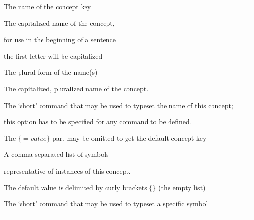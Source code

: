 \documentclass[10pt]{article}
\begin{document}
\begin{description}
	\item[name]            
    \item The name of the concept key
	\item[Name]            
	\item The capitalized name of the concept, 
	\item for use in the beginning of a sentence 
	\item the first letter will be capitalized
	\item[plural]            
	\item The plural form of the name(s)
	\item[Plural]            
	\item The capitalized, pluralized name of the concept.
	\item[namecmd]       
	\item The `short' command that may be used to typeset the name of this concept; 
	\item this option has to be specified for any command to be defined. 
	\item The $\{=value\}$ part may be omitted to get the default concept key
	\item[symbols]          
	\item A comma-separated list of symbols 
	\item representative of instances of this concept. 
	\item The default value is delimited by curly brackets $\{\}$ (the empty list)
	\item[symbolcmd]     
	\item The `short' command that may be used to typeset a specific symbol
\end{description}
\vspace{0.10in}
\hrule
\pagebreak


\vspace{.25in}
\end{document}
